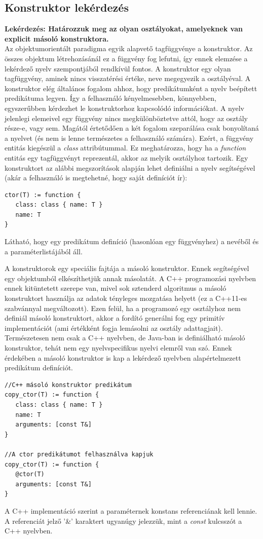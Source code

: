 \documentclass[a4paper,12pt]{report}
\begin{document}
\subsection{Konstruktor lekérdezés}
\textbf{Lekérdezés: Határozzuk meg az olyan osztályokat, amelyeknek van explicit másoló konstruktora.}
\\
Az objektumorientált paradigma egyik alapvető tagfüggvénye a konstruktor. Az összes objektum létrehozásánál ez a függvény fog lefutni, így ennek elemzése a lekérdező nyelv szempontjából rendkívül fontos. A konstruktor egy olyan tagfüggvény, aminek nincs visszatérési értéke, neve megegyezik a osztályéval. A konstruktor elég általános fogalom ahhoz, hogy predikátumként a nyelv beépített predikátuma legyen. Így a felhasználó kényelmesebben, könnyebben, egyszerűbben kérdezhet le konstruktorhoz kapcsolódó információkat. A nyelv jelenlegi elemeivel egy függvény nincs megkülönböztetve attól, hogy az osztály része-e, vagy sem. Magától értetődően a két fogalom szeparálása csak bonyolítaná a nyelvet (és nem is lenne természetes a felhasználó számára). Ezért, a függvény entitás kiegészül a \textit{class} attribútummal. Ez meghatározza, hogy ha a \textit{function} entitás egy tagfüggvényt reprezentál, akkor az melyik osztályhoz tartozik. Egy konstruktort az alábbi megszorítások alapján lehet definiálni a nyelv segítségével (akár a felhasználó is megtehetné, hogy saját definíciót ír):
\begin{verbatim}
ctor(T) := function {
   class: class { name: T }
   name: T
}
\end{verbatim}
\par Látható, hogy egy predikátum definíció (hasonlóan egy függvényhez) a nevéből és a paraméterlistájából áll.
\par A konstruktorok egy speciális fajtája a másoló konstruktor. Ennek segítségével egy objektumból elkészíthetjük annak másolatát. A C++ programozási nyelvben ennek kitüntetett szerepe van, mivel sok sztenderd algoritmus a másoló konstruktort használja az adatok tényleges mozgatása helyett (ez a C++11-es szabvánnyal megváltozott). Ezen felül, ha a programozó egy osztályhoz nem definiál másoló konstruktort, akkor a fordító generálni fog egy primitív implementációt (ami értékként fogja lemásolni az osztály adattagjait). Természetesen nem csak a C++ nyelvben, de Java-ban is definiálható másoló konstruktor, tehát nem egy nyelvspecifikus nyelvi elemről van szó. Ennek érdekében a másoló konstruktor is kap a lekérdező nyelvben alapértelmezett predikátum definíciót.
\begin{verbatim}
//C++ másoló konstruktor predikátum
copy_ctor(T) := function {
   class: class { name: T }
   name: T
   arguments: [const T&]
}

//A ctor predikátumot felhasználva kapjuk
copy_ctor(T) := function {
   @ctor(T)
   arguments: [const T&]
}
\end{verbatim}
\par A C++ implementáció szerint a paraméternek konstans referenciának kell lennie. A referenciát jelző '\&' karaktert ugyanúgy jelezzük, mint a \textit{const} kulcsszót a C++ nyelvben. 
\end{document}
